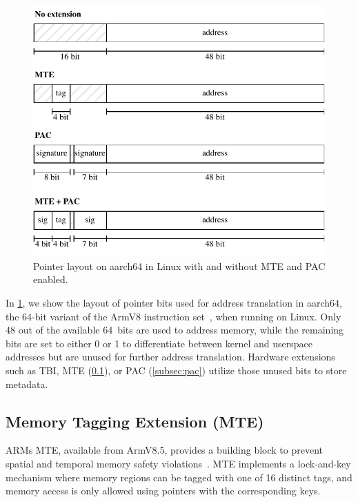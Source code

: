 \begin{figure}[t]
    \centering
    \includegraphics[scale=1]{figures/build/pointer-aarch64}
    \caption{Pointer layout on aarch64 in Linux with and without \ac{MTE} and \ac{PAC} enabled.}
    \label{fig:aarch64-pointer}
\end{figure}

In \cref{fig:aarch64-pointer}, we show the layout of pointer bits used for address translation in aarch64, the 64-bit variant of the ArmV8 instruction set~\cite{ARMA2024Arch64}, when running on Linux.
Only 48 out of the available 64\ bits are used to address memory, while the remaining bits are set to either 0 or 1 to differentiate between kernel and userspace addresses but are unused for further address translation.
Hardware extensions such as \ac{TBI}, \ac{MTE} (\cref{subsec:mte}), or \ac{PAC} (\cref{subsec:pac}) utilize those unused bits to store metadata.

\subsection{Memory Tagging Extension (MTE)}
\label{subsec:mte}

ARMs \Ac{MTE}, available from ArmV8.5, provides a building block to prevent spatial and temporal memory safety violations~\cite{ARM2019MTE}.
\Ac{MTE} implements a lock-and-key mechanism where memory regions can be tagged with one of 16 distinct tags, and memory access is only allowed using pointers with the corresponding keys.


